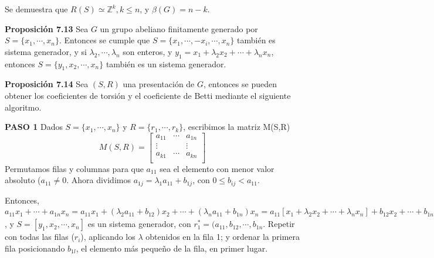 \documentclass[a4paper, 11pt]{extarticle}
\newcommand{\propo}[1]{\textcolor{rojo}{\textbf{Proposición #1}}}
\begin{document}
Se demuestra que \(R(S) \simeq \mathbb{Z}^k, k \le n\), y \(\beta(G) = n - k\).

\propo{7.13} Sea \(G\) un grupo abeliano finitamente generado por \(S = \{
x_1, \cdots, x_n \}\). Entonces se cumple que  \(S = \{ x_1, \cdots,
-x_i, \cdots, x_n\}\) también es sistema generador, y si \(\lambda _2, \cdots, \lambda _n\) son
enteros, y \(y_1 = x_1 + \lambda_2 x_2 + \cdots + \lambda _n x_n\), entonces \(S = \{
y_1, x_2, \cdots, x_n \}\) también es un sistema generador.

\propo{7.14} Sea \((S,R)\) una presentación de \(G\), entonces se pueden
obtener los coeficientes de torsión y el coeficiente de Betti mediante el
siguiente algoritmo.

\textbf{PASO 1} Dados \(S=\{ x_1, \cdots, x_n \}\) y \(R = \{ r_1, \cdots, r_k \}\), escribimos la
matriz M(S,R)
\[   M(S,R) =  \begin{bmatrix}
a_{11} &  \cdots  &  a_{1n} \\ 
\vdots
&   &  \vdots \\
a_{k1} & \cdots &  a_{kn} \\ 
\end{bmatrix}    \]
Permutamos filas y columnas para que \(a_{11}\) sea el elemento con menor
valor absoluto (\(a_{11} \neq 0\). Ahora dividimos \(a_{1j} = \lambda_{1}
a_{11} + b_{1j}\), con \(0 \le b_{ij} < a_{11}\).

Entonces, \(a_{11}x_1 + \cdots + a_{1n}x_n = a_{11}x_1 + (\lambda_2a_{11} + b_{12})
x_2 + \cdots + (\lambda _n a_{11} + b_{1n}) x_n = a_{11}[x_1 + \lambda _2x_2 + \cdots + \lambda _nx_n] +
b_{12}x_2 + \cdots + b_{1n}x_n =   a_{11}[y_1] +
b_{12}x_2 + \cdots + b_{1n}x_n = 0\), y \(S = [y_1, x_2, \cdots, x_n]\) es un sistema
generador, con \(r_1^* = (a_{11}, b_{12}, \cdots, b_{1n}\). Repetir con todas las
filas (\(r_i\)), aplicando los \(\lambda\) obtenidos en la fila 1;
 y ordenar la primera fila  posicionando \(b_{1l}\), el
elemento más pequeño de la fila, en primer lugar.
\end{document}
